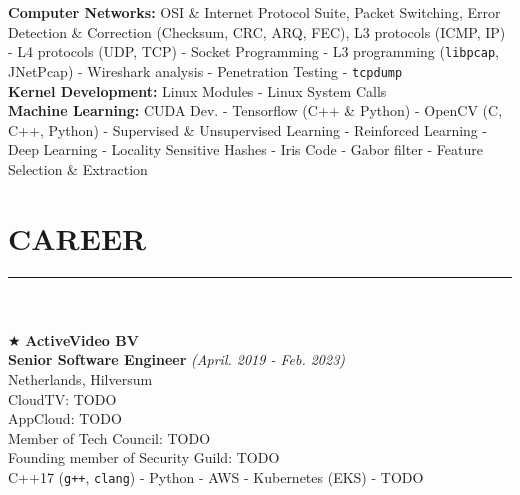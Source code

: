 \documentclass[10pt,a4paper]{article}
\begin{document}
\textbullet \hspace{0.1cm}\textbf{Computer Networks:} OSI \& Internet Protocol Suite, Packet Switching, Error Detection \& Correction (Checksum, CRC, ARQ, FEC), L3 protocols (ICMP, IP) - L4 protocols (UDP, TCP) - Socket Programming - L3 programming (\texttt{libpcap}, JNetPcap) - Wireshark analysis - Penetration Testing - \texttt{tcpdump} \\
\textbullet \hspace{0.1cm}\textbf{Kernel Development:} Linux Modules - Linux System Calls \\
\textbullet \hspace{0.1cm}\textbf{Machine Learning:} CUDA Dev. - Tensorflow (C++ \& Python) - OpenCV (C, C++, Python) - Supervised \& Unsupervised Learning - Reinforced Learning - Deep Learning - Locality Sensitive Hashes - Iris Code - Gabor filter - Feature Selection \& Extraction \\

\section{CAREER}
\noindent\rule {18.0cm}{0.2pt} \\ \\
$\bigstar$ \hspace{0.1cm} \large \textbf{ActiveVideo BV} \\
\indent \small \textbf{Senior Software Engineer} \textsl{(April. 2019 - Feb. 2023)} \\
\indent \textnormal{Netherlands, Hilversum} \\
\indent \textbullet \hspace{0.05cm} CloudTV: TODO \\
\indent \textbullet \hspace{0.05cm} AppCloud: TODO \\
\indent \textbullet \hspace{0.05cm} Member of Tech Council: TODO \\
\indent \textbullet \hspace{0.05cm} Founding member of Security Guild: TODO \\
\indent \textbullet \hspace{0.05cm} C++17 (\texttt{g++}, \texttt{clang}) - Python - AWS - Kubernetes (EKS) - TODO \\
\end{document}

